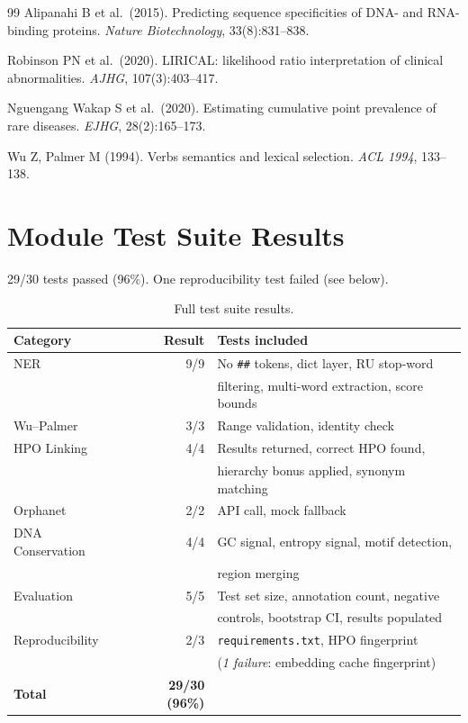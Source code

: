 \documentclass[11pt,a4paper]{article}
\begin{document}
\begin{thebibliography}{99}
Alipanahi B et al.\ (2015).
Predicting sequence specificities of DNA- and RNA-binding proteins.
\textit{Nature Biotechnology}, 33(8):831--838.

Robinson PN et al.\ (2020).
LIRICAL: likelihood ratio interpretation of clinical abnormalities.
\textit{AJHG}, 107(3):403--417.

Nguengang Wakap S et al.\ (2020).
Estimating cumulative point prevalence of rare diseases.
\textit{EJHG}, 28(2):165--173.

Wu Z, Palmer M (1994).
Verbs semantics and lexical selection.
\textit{ACL 1994}, 133--138.

\end{thebibliography}

\appendix

\section{Module Test Suite Results}

29/30 tests passed (96\%).  One reproducibility test failed (see below).

\begin{table}[H]
\centering
\caption{Full test suite results.}
\label{tab:tests}
\begin{tabular}{lrl}
\toprule
\textbf{Category} & \textbf{Result} & \textbf{Tests included} \\
\midrule
NER           & 9/9  & No \texttt{\#\#} tokens, dict layer, RU stop-word \\
              &      & filtering, multi-word extraction, score bounds \\
Wu--Palmer    & 3/3  & Range validation, identity check \\
HPO Linking   & 4/4  & Results returned, correct HPO found, \\
              &      & hierarchy bonus applied, synonym matching \\
Orphanet      & 2/2  & API call, mock fallback \\
DNA Conservation & 4/4 & GC signal, entropy signal, motif detection, \\
              &      & region merging \\
Evaluation    & 5/5  & Test set size, annotation count, negative \\
              &      & controls, bootstrap CI, results populated \\
Reproducibility & 2/3 & \texttt{requirements.txt}, HPO fingerprint \\
              &      & (\textit{1 failure}: embedding cache fingerprint) \\
\midrule
\textbf{Total} & \textbf{29/30 (96\%)} & \\
\bottomrule
\end{tabular}
\end{table}
\end{document}
